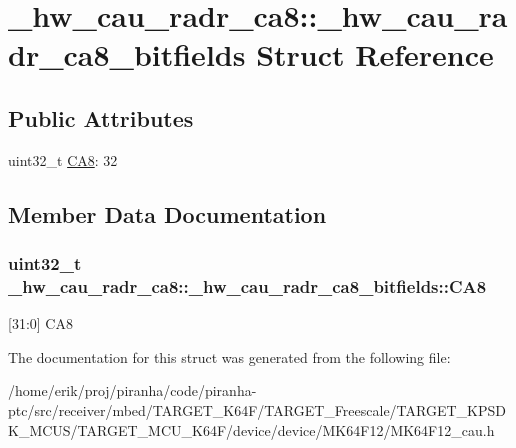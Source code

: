 \hypertarget{struct__hw__cau__radr__ca8_1_1__hw__cau__radr__ca8__bitfields}{}\section{\+\_\+hw\+\_\+cau\+\_\+radr\+\_\+ca8\+:\+:\+\_\+hw\+\_\+cau\+\_\+radr\+\_\+ca8\+\_\+bitfields Struct Reference}
\label{struct__hw__cau__radr__ca8_1_1__hw__cau__radr__ca8__bitfields}
\subsection*{Public Attributes}
\begin{DoxyCompactItemize}
\item 
uint32\+\_\+t \hyperlink{struct__hw__cau__radr__ca8_1_1__hw__cau__radr__ca8__bitfields_aefe279252be1d7add3f622f0eac944b5}{C\+A8}\+: 32
\end{DoxyCompactItemize}


\subsection{Member Data Documentation}
\subsubsection[{\texorpdfstring{C\+A8}{CA8}}]{\setlength{\rightskip}{0pt plus 5cm}uint32\+\_\+t \+\_\+hw\+\_\+cau\+\_\+radr\+\_\+ca8\+::\+\_\+hw\+\_\+cau\+\_\+radr\+\_\+ca8\+\_\+bitfields\+::\+C\+A8}\hypertarget{struct__hw__cau__radr__ca8_1_1__hw__cau__radr__ca8__bitfields_aefe279252be1d7add3f622f0eac944b5}{}\label{struct__hw__cau__radr__ca8_1_1__hw__cau__radr__ca8__bitfields_aefe279252be1d7add3f622f0eac944b5}
\mbox{[}31\+:0\mbox{]} C\+A8 

The documentation for this struct was generated from the following file\+:\begin{DoxyCompactItemize}
\item 
/home/erik/proj/piranha/code/piranha-\/ptc/src/receiver/mbed/\+T\+A\+R\+G\+E\+T\+\_\+\+K64\+F/\+T\+A\+R\+G\+E\+T\+\_\+\+Freescale/\+T\+A\+R\+G\+E\+T\+\_\+\+K\+P\+S\+D\+K\+\_\+\+M\+C\+U\+S/\+T\+A\+R\+G\+E\+T\+\_\+\+M\+C\+U\+\_\+\+K64\+F/device/device/\+M\+K64\+F12/M\+K64\+F12\+\_\+cau.\+h\end{DoxyCompactItemize}
